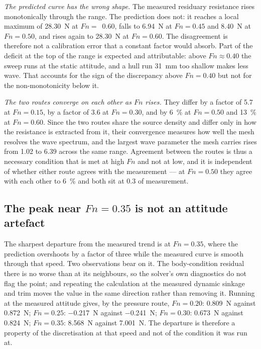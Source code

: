 \documentclass[11pt]{article}
\newcommand{\Fn}{\mathit{Fn}}
\begin{document}
\textit{The predicted curve has the wrong shape.} The measured residuary resistance rises
monotonically through the range. The prediction does not: it reaches a local maximum of
\SI{28.30}{\newton} at $\Fn = $~0.60, falls to \SI{6.94}{\newton} at $\Fn = 0.45$ and
\SI{8.40}{\newton} at $\Fn = 0.50$, and rises again to \SI{28.30}{\newton} at
$\Fn = 0.60$. The disagreement is therefore not a calibration error that a constant factor
would absorb. Part of the deficit at the top of the range is expected and attributable:
above $\Fn \approx 0.40$ the sweep runs at the static attitude, and a hull run
\SI{31}{\milli\metre} too shallow makes less wave. That accounts for the sign of the discrepancy above $\Fn = 0.40$ but not for the
non-monotonicity below it.

\textit{The two routes converge on each other as $\Fn$ rises.} They differ by a factor of
\num{5.7} at $\Fn = 0.15$, by a factor of \num{3.6} at $\Fn = 0.30$, and by \SI{6}{\percent} at
$\Fn = 0.50$ and \SI{13}{\percent} at $\Fn = 0.60$. Since the two routes share the source
density and differ only in how the resistance is extracted from it, their convergence
measures how well the mesh resolves the wave spectrum, and the largest wave parameter the
mesh carries rises from \num{1.02} to \num{6.39} across the same range. Agreement between
the routes is thus a necessary condition that is met at high $\Fn$ and not at low, and it is
independent of whether either route agrees with the measurement --- at $\Fn = 0.50$ they
agree with each other to \SI{6}{\percent} and both sit at \num{0.3} of measurement.

\subsection{The peak near \texorpdfstring{$\Fn = 0.35$}{Fn = 0.35} is not an attitude
artefact}

The sharpest departure from the measured trend is at $\Fn = 0.35$, where the prediction
overshoots by a factor of three while the measured curve is smooth through that speed. Two
observations bear on it. The body-condition residual there is no worse than at its
neighbours, so the solver's own diagnostics do not flag the point; and repeating the
calculation at the measured dynamic sinkage and trim moves the value in the same direction
rather than removing it. Running at the measured attitude gives, by the pressure route,
$\Fn = 0.20$: \SI{0.809}{\newton} against \SI{0.872}{\newton}; $\Fn = 0.25$: \SI{-0.217}{\newton} against \SI{-0.241}{\newton}; $\Fn = 0.30$: \SI{0.673}{\newton} against \SI{0.824}{\newton}; $\Fn = 0.35$: \SI{8.568}{\newton} against \SI{7.001}{\newton}. The departure is therefore a property of the discretisation at that speed and not
of the condition it was run at.
\end{document}
